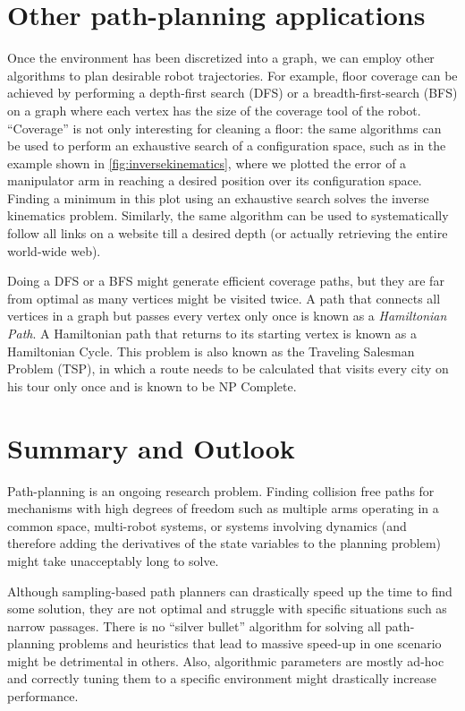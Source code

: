 \section{Other path-planning applications}

Once the environment has been discretized into a graph, we can employ other algorithms to plan desirable robot trajectories. For example, floor coverage can be achieved by performing a depth-first search (DFS) or a breadth-first-search (BFS) on a graph where each vertex has the size of the coverage tool of the robot. ``Coverage'' is not only interesting for cleaning a floor: the same algorithms can be used to perform an exhaustive search of a configuration space, such as in the example shown in \cref{fig:inversekinematics}, where we plotted the error of a manipulator arm in reaching a desired position over its configuration space. Finding a minimum in this plot using an exhaustive search solves the inverse kinematics problem. Similarly, the same algorithm can be used to systematically follow all links on a website till a desired depth (or actually retrieving the entire world-wide web).

Doing a DFS or a BFS might generate efficient coverage paths, but they are far from optimal as many vertices might be visited twice. A path that connects all vertices in a graph but passes every vertex only once is known as a \textsl{Hamiltonian Path}. A Hamiltonian path that returns to its starting vertex is known as a Hamiltonian Cycle. This problem is also known as the Traveling Salesman Problem (TSP), in which a route needs to be calculated that visits every city on his tour only once and is known to be NP Complete.


\section{Summary and Outlook}
Path-planning is an ongoing research problem. Finding collision free paths for mechanisms with high degrees of freedom such as multiple arms operating in a common space, multi-robot systems, or systems involving dynamics (and therefore adding the derivatives of the state variables to the planning problem) might take unacceptably long to solve.

Although sampling-based path planners can drastically speed up the time to find some solution, they are not optimal and struggle with specific situations such as narrow passages. There is no ``silver bullet'' algorithm for solving all path-planning problems and heuristics that lead to massive speed-up in one scenario might be detrimental in others. Also, algorithmic parameters are mostly ad-hoc and correctly tuning them to a specific environment might drastically increase performance.


